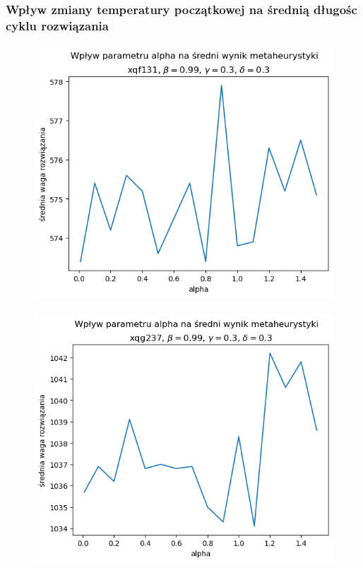 \documentclass{article}
\begin{document}
\subsubsection{Wpływ zmiany temperatury początkowej na średnią długośc cyklu rozwiązania}
    \begin{figure}[h!]
        \centering
        \includegraphics[height=9.5cm]{../../plots/sa-tuning-alpha-avg-xqf131.png}
    \end{figure}

    \begin{figure}[h!]
        \centering
        \includegraphics[height=9.5cm]{../../plots/sa-tuning-alpha-avg-xqg237.png}
    \end{figure}

\newpage
\end{document}
